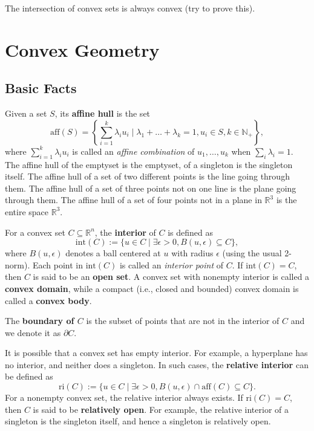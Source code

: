 \documentclass[
]{book}
\theoremstyle{definition}
\theoremstyle{definition}
\theoremstyle{definition}
\theoremstyle{definition}
\theoremstyle{remark}
\begin{document}
The intersection of convex sets is always convex (try to prove this).

\hypertarget{background:convex:geometry}{%
\section{Convex Geometry}\label{background:convex:geometry}}

\hypertarget{basic-facts}{%
\subsection{Basic Facts}\label{basic-facts}}

Given a set \(S\), its \textbf{affine hull} is the set
\[
\mathrm{aff}(S) =  \left\{  \sum_{i=1}^k \lambda_i u_i \mid \lambda_1 + \dots + \lambda_k = 1, u_i \in S, k \in \mathbb{N}_{+}  \right\} ,
\]
where \(\sum_{i=1}^{k} \lambda_i u_i\) is called an \emph{affine combination} of \(u_1,\dots,u_k\) when \(\sum_i \lambda_i = 1\). The affine hull of the emptyset is the emptyset, of a singleton is the singleton itself. The affine hull of a set of two different points is the line going through them. The affine hull of a set of three points not on one line is the plane going through them. The affine hull of a set of four points not in a plane in \(\mathbb{R}^{3}\) is the entire space \(\mathbb{R}^{3}\).

For a convex set \(C \subseteq \mathbb{R}^{n}\), the \textbf{interior} of \(C\) is defined as
\[
\mathrm{int}(C) := \{  u \in C \mid \exists \epsilon > 0, B(u,\epsilon) \subseteq C  \},
\]
where \(B(u,\epsilon)\) denotes a ball centered at \(u\) with radius \(\epsilon\) (using the usual 2-norm). Each point in \(\mathrm{int}(C)\) is called an \emph{interior point} of \(C\). If \(\mathrm{int}(C) = C\), then \(C\) is said to be an \textbf{open set}. A convex set with nonempty interior is called a \textbf{convex domain}, while a compact (i.e., closed and bounded) convex domain is called a \textbf{convex body}.

The \textbf{boundary of \(C\)} is the subset of points that are not in the interior of \(C\) and we denote it as \(\partial C\).

It is possible that a convex set has empty interior. For example, a hyperplane has no interior, and neither does a singleton. In such cases, the \textbf{relative interior} can be defined as
\[
\mathrm{ri}(C) := \{  u \in C \mid \exists \epsilon > 0, B(u,\epsilon) \cap \mathrm{aff}(C) \subseteq C  \}.
\]
For a nonempty convex set, the relative interior always exists. If \(\mathrm{ri}(C) = C\), then \(C\) is said to be \textbf{relatively open}. For example, the relative interior of a singleton is the singleton itself, and hence a singleton is relatively open.
\end{document}

